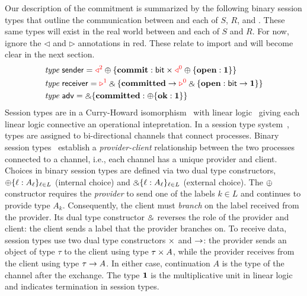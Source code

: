 Our description of the commitment is summarized by the following binary session types that
outline the communication between \Fcom and each of $S$, $R$, and \A.
These same types will exist in the real world between \Z and each of $S$ and $R$.
For now, ignore the $\triangleleft$ and $\triangleright$ annotations in red.
These relate to import and will become clear in the next section.
\begin{align*}
  &\relax{\it type} \; \mathsf{sender} = \textcolor{red}{\triangleleft^2} \oplus \{ \mathbf{commit} : \mathsf{bit} \times \textcolor{red}{\triangleleft^0} \oplus \{ \mathbf{open} : \mathbf{1} \} \} \\
  &\relax{\it type} \; \mathsf{receiver} = \textcolor{red}{\triangleright^1} \mathbin{\binampersand} \{ \mathbf{committed} \rightarrow \textcolor{red}{\triangleright^0} \mathbin{\binampersand} \{ \mathbf{open}: \mathsf{bit} \rightarrow \mathbf{1} \} \} \\
  &\relax{\it type} \; \mathsf{adv} = \mathbin{\binampersand} \{ \mathbf{committed}: \oplus \{ \mathbf{ok}: \mathbf{1} \} \}
\end{align*}
Session types are in a Curry-Howard isomorphism~\cite{caires2010session} with
linear logic~\cite{girard1987linear} giving each linear logic connective
an operational intepretation.
In a session type system~\cite{HondaCONCUR1993,Scalas19POPL,HondaPOPL2008},
types are assigned to bi-directional channels that connect processes.
Binary session types~\cite{PfenningFOSSACS2015,Das20FSCD}
establish a \emph{provider-client} relationship between the two processes connected
to a channel, i.e., each channel has a unique provider and client.
Choices in binary session types are defined via two dual type constructors,
$\oplus \{ \ell : A_\ell \}_{\ell \in L}$ (internal choice) and $\mathbin{\binampersand} \{ \ell : A_\ell \}_{\ell \in L}$
(external choice).
The $\oplus$ constructor requires the \emph{provider} to send one of the labels $k \in L$
and continues to provide type $A_k$.
Consequently, the client must \emph{branch} on the label received from the provider.
Its dual type constructor $\mathbin{\binampersand}$ reverses the role of the provider and client:
the client sends a label that the provider branches on.
To receive data, session types use two dual type constructors $\times$ and $\rightarrow$:
the provider sends an object of type $\tau$ to the client using type $\tau \times A$,
while the provider receives from the client using type $\tau \rightarrow A$.
In either case, continuation $A$ is the type of the channel after the exchange.
The type $\mathbf{1}$ is the multiplicative unit in linear logic and indicates
termination in session types.

